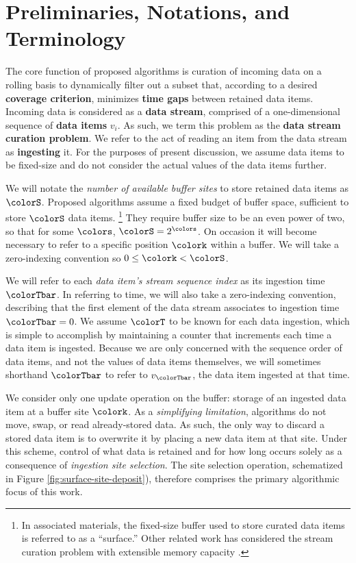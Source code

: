 \section{Preliminaries, Notations, and Terminology} \label{sec:notation}



The core function of proposed algorithms is curation of incoming data on a rolling basis to dynamically filter out a subset that, according to a desired \textbf{coverage criterion}, minimizes \textbf{time gaps} between retained data items.
Incoming data is considered as a \textbf{data stream}, comprised of a one-dimensional sequence of \textbf{data items} $v_i$.
As such, we term this problem as the \textbf{data stream curation problem}.
We refer to the act of reading an item from the data stream as \textbf{ingesting} it.
For the purposes of present discussion, we assume data items to be fixed-size and do not consider the actual values of the data items further.

We will notate the \textit{number of available buffer sites} to store retained data items as $\colorS$.
Proposed algorithms assume a fixed budget of buffer space, sufficient to store $\colorS$ data items.%
\footnote{%
In associated materials, the fixed-size buffer used to store curated data items is referred to as a ``surface.''
Other related work has considered the stream curation problem with extensible memory capacity \citep{moreno2024algorithms}.%
}
They require buffer size to be an even power of two, so that for some $\colors$, $\colorS = 2^{\colors}$.
On occasion it will become necessary to refer to a specific position $\colork$ within a buffer.
We will take a zero-indexing convention so $0 \leq \colork < \colorS$.

We will refer to each \textit{data item's stream sequence index} as its ingestion time $\colorTbar$.
In referring to time, we will also take a zero-indexing convention, describing that the first element of the data stream associates to ingestion time $\colorTbar=0$.
We assume $\colorT$ to be known for each data ingestion, which is simple to accomplish by maintaining a counter that increments each time a data item is ingested.
Because we are only concerned with the sequence order of data items, and not the values of data items themselves, we will sometimes shorthand $\colorTbar$ to refer to $v_{\colorTbar}$, the data item ingested at that time.

We consider only one update operation on the buffer: storage of an ingested data item at a buffer site $\colork$.
As a \textit{simplifying limitation}, algorithms do not move, swap, or read already-stored data.
As such, the only way to discard a stored data item is to overwrite it by placing a new data item at that site.
Under this scheme, control of what data is retained and for how long occurs solely as a consequence of \textit{ingestion site selection}.
The site selection operation, schematized in Figure \ref{fig:surface-site-deposit}), therefore comprises the primary algorithmic focus of this work.

